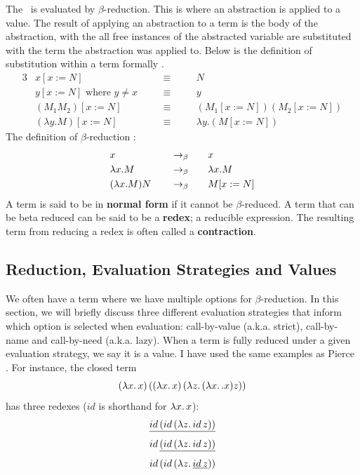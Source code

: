 \noindent The \lcalc\ is evaluated by $\beta$-reduction. This is where an abstraction is applied to a value. The result of applying an abstraction to a term is the body of the abstraction, with the all free instances of the abstracted variable are substituted with the term the abstraction was applied to. Below is the definition of substitution within a term formally \cite{barendregt2013lambda}. 
\noindent\begin{alignat*}{3}
&x[x:=N]                        \quad && \equiv \quad && N                       \\
&y[x:=N] \text{ where } y \ne x \quad && \equiv \quad && y                       \\
&(M_1 M_2)[x:=N]                \quad && \equiv \quad && (M_1[x:=N]) (M_2[x:=N]) \\
&(\lambda y.M)[x:=N]            \quad && \equiv \quad && \lambda y.(M[x:=N])     
\end{alignat*}  
\noindent The definition of $\beta$-reduction \cite{barendregt2013lambda}:
\begin{alignat*}{3}
&x                 \quad && \rightarrow_\beta \quad &&        x           \\
&\lambda x.M       \quad && \rightarrow_\beta \quad &&        \lambda x.M \\
&(\lambda x.M) N   \quad && \rightarrow_\beta \quad &&        M[x:=N]
\end{alignat*}
A term is said to be in \textbf{normal form} if it cannot be $\beta$-reduced. A term that can be beta reduced can be said to be a \textbf{redex}; a reducible expression. The resulting term from reducing a redex is often called a \textbf{contraction}.

\subsection{Reduction, Evaluation Strategies and Values}
\label{bg:eval_strategies}
We often have a term where we have multiple options for $\beta$-reduction. In this section, we will briefly discuss three different evaluation strategies that inform which option is selected when evaluation: call-by-value (a.k.a. strict), call-by-name and call-by-need (a.k.a. lazy). When a term is fully reduced under a given evaluation strategy, we say it is a value. I have used the same examples as Pierce \cite{pierce2002types}. For instance, the closed term 
\[(\lambda x.\, x)\,((\lambda x.\, x)\,(\lambda z.\, (\lambda x.\,. x) z))\] has three redexes ($id$ is shorthand for $\lambda x.\, x$):
\[\underline{id\,(id\,(\lambda z.\, id\,z))}\]
\[id\,\underline{(id\,(\lambda z.\, id\,z))}\]
\[id\,(id\,(\lambda z.\, \underline{id\,z}))\]

